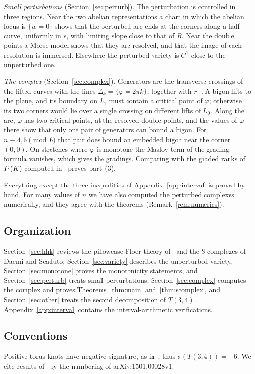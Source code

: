 \emph{Small perturbations} (Section~\ref{sec:perturb}). The perturbation is controlled in three regions. Near
the two abelian representations a chart in which the abelian locus is $\{w=0\}$ shows that the perturbed arc
ends at the corners along a half-curve, uniformly in $\epsilon$, with limiting slope close to that of $B$. Near
the double points a Morse model shows that they are resolved, and that the image of each resolution is
immersed. Elsewhere the perturbed variety is $C^1$-close to the unperturbed one.

\emph{The complex} (Section~\ref{sec:complex}). Generators are the transverse crossings of the lifted curves
with the lines $\Delta_k=\{\varphi=2\pi k\}$, together with $r_+$. A bigon lifts to the plane, and its boundary on
$L_1$ must contain a critical point of $\varphi$; otherwise its two corners would lie over a single crossing on
different lifts of $L_0$. Along the arc, $\varphi$ has two critical points, at the resolved double points, and
the values of $\varphi$ there show that only one pair of generators can bound a bigon. For $n\equiv4,5\pmod6$
that pair does bound an embedded bigon near the corner $(0,0)$. On stretches where $\varphi$ is monotone the
Maslov term of the grading formula vanishes, which gives the gradings. Comparing with the graded ranks of
$I^{\natural}(K)$ computed in~\cite{W26} proves part~(3).

Everything except the three inequalities of Appendix~\ref{app:interval} is proved by hand. For many values
of $n$ we have also computed the perturbed complexes numerically, and they agree with the theorems
(Remark~\ref{rem:numerics}).

\subsection*{Organization}
Section~\ref{sec:hhk} reviews the pillowcase Floer theory of~\cite{HHK2} and the S-complexes of Daemi and
Scaduto. Section~\ref{sec:variety} describes the unperturbed variety, Section~\ref{sec:monotone} proves the
monotonicity statements, and Section~\ref{sec:perturb} treats small perturbations. Section~\ref{sec:complex}
computes the complex and proves Theorems~\ref{thm:main} and~\ref{thm:scomplex}, and Section~\ref{sec:other}
treats the second decomposition of $T(3,4)$. Appendix~\ref{app:interval} contains the interval-arithmetic
verifications.

\subsection*{Conventions}
Positive torus knots have negative signature, as in~\cite{HHK2}; thus $\sigma(T(3,4))=-6$. We cite results
of~\cite{HHK2} by the numbering of arXiv:1501.00028v1.
